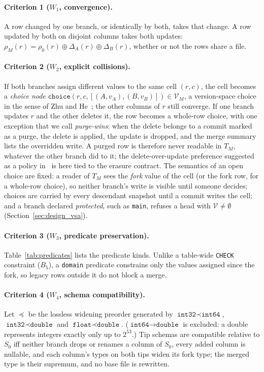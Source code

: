 \documentclass[sigconf, nonacm]{acmart}
\begin{document}
\paragraph{Criterion 1 ($W_1$, convergence).} A row changed by one branch, or identically by both, takes that change. A row updated by both on disjoint columns takes both updates: $\rho_M(r) = \rho_0(r) \oplus \Delta_A(r) \oplus \Delta_B(r)$, whether or not the rows share a file.

\paragraph{Criterion 2 ($W_2$, explicit collisions).} If both branches assign different values to the same cell $(r, c)$, the cell becomes a \emph{choice node} $\texttt{choice}(r, c, [(A, v_A), (B, v_B)]) \in \mathcal{V}_M$, a version-space choice in the sense of Zhu and He~\cite{zhu2018conflict}; the other columns of $r$ still converge. If one branch updates $r$ and the other deletes it, the row becomes a whole-row choice, with one exception that we call \emph{purge-wins}: when the delete belongs to a commit marked as a purge, the delete is applied, the update is dropped, and the merge summary lists the overridden write. A purged row is therefore never readable in $T_M$, whatever the other branch did to it; the delete-over-update preference suggested as a policy in~\cite{yilmaz2025gvc} is here tied to the erasure contract. The semantics of an open choice are fixed: a reader of $T_M$ sees the \emph{fork} value of the cell (or the fork row, for a whole-row choice), so neither branch's write is visible until someone decides; choices are carried by every descendant snapshot until a commit writes the cell; and a branch declared \emph{protected}, such as \texttt{main}, refuses a head with $\mathcal{V} \neq \emptyset$ (Section~\ref{sec:design_vsa}).

\paragraph{Criterion 3 ($W_3$, predicate preservation).} Table~\ref{tab:predicates} lists the predicate kinds. Unlike a table-wide \texttt{CHECK} constraint ($B_5$), a \texttt{domain} predicate constrains only the values assigned since the fork, so legacy rows outside it do not block a merge.

\paragraph{Criterion 4 ($W_4$, schema compatibility).} Let $\preceq$ be the lossless widening preorder generated by $\texttt{int32} \prec \texttt{int64}$, $\texttt{int32} \prec \texttt{double}$ and $\texttt{float} \prec \texttt{double}$. ($\texttt{int64} \to \texttt{double}$ is excluded: a double represents integers exactly only up to $2^{53}$.) Tip schemas are compatible relative to $S_0$ iff neither branch drops or renames a column of $S_0$, every added column is nullable, and each column's types on both tips widen its fork type; the merged type is their supremum, and no base file is rewritten.
\end{document}
